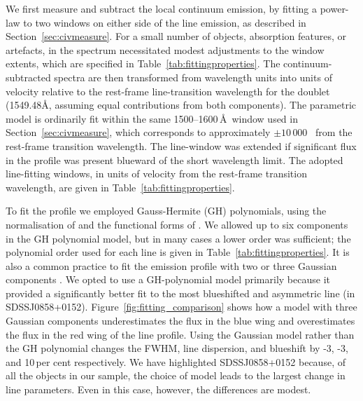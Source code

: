 We first measure and subtract the local continuum emission, by fitting a power-law to two windows on either side of the line emission, as described in Section~\ref{sec:civmeasure}. 
For a small number of objects, absorption features, or artefacts, in the spectrum necessitated modest adjustments to the window extents, which are specified in Table~\ref{tab:fittingproperties}. 
The continuum-subtracted spectra are then transformed from wavelength units into units of velocity relative to the rest-frame line-transition wavelength for the  doublet (1549.48\AA, assuming equal contributions from both components). 
The parametric model is ordinarily fit within the same 1500--1600\,\AA \, window used in Section~\ref{sec:civmeasure}, which corresponds to approximately $\pm 10\,000$ \kms\, from the rest-frame transition wavelength. 
The line-window was extended if significant flux in the profile was present blueward of the short wavelength limit. 
The adopted line-fitting windows, in units of velocity from the rest-frame transition wavelength, are given in Table~\ref{tab:fittingproperties}. 

To fit the  profile we employed Gauss-Hermite (GH) polynomials, using the normalisation of \citet{marel93} and the functional forms of \citet{cappellari02}.
We allowed up to six components in the GH polynomial model, but in many cases a lower order was sufficient; the polynomial order used for each line is given in Table~\ref{tab:fittingproperties}.
It is also a common practice to fit the  emission profile with two or three Gaussian components \citep[e.g.][]{shen11}. 
We opted to use a GH-polynomial model primarily because it provided a significantly better fit to the most blueshifted and asymmetric  line (in SDSSJ0858+0152).  
Figure~\ref{fig:fitting_comparison} shows how a model with three Gaussian components underestimates the flux in the blue wing and overestimates the flux in the red wing of the line profile. 
Using the Gaussian model rather than the GH polynomial changes the FWHM, line dispersion, and blueshift by -3, -3, and 10\,per cent respectively.
We have highlighted SDSSJ0858+0152 because, of all the objects in our sample, the choice of model leads to the largest change in  line parameters.
Even in this case, however, the differences are modest. 

